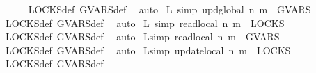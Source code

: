 \begin{isabellebody}
\isadelimproof
\ \ \ \ %
\endisadelimproof
%
\isatagproof
{}\isamarkupfalse%
\ LOCKS{\isacharunderscore}{\kern0pt}def\ GVARS{\isacharunderscore}{\kern0pt}def\ \isamarkupfalse%
\ auto%
\endisatagproof
{\isafoldproof}%
%
\isadelimproof
%
\endisadelimproof
\isanewline
{}\isamarkupfalse%
\ L{}\ {\isacharbrackleft}{\kern0pt}simp{\isacharbrackright}{\kern0pt}{\isacharcolon}{\kern0pt}\ {\isacartoucheopen}upd\isactrlsub g\isactrlsub l\isactrlsub o\isactrlsub b\isactrlsub a\isactrlsub l\ n\ m\ {\isasymin}\ GVARS{\isacartoucheclose}%
\isadelimproof
\ \ \ \ %
\endisadelimproof
%
\isatagproof
{}\isamarkupfalse%
\ LOCKS{\isacharunderscore}{\kern0pt}def\ GVARS{\isacharunderscore}{\kern0pt}def\ \isamarkupfalse%
\ auto%
\endisatagproof
{\isafoldproof}%
%
\isadelimproof
%
\endisadelimproof
\isanewline
\isanewline
{}\isamarkupfalse%
\ L{}\ {\isacharbrackleft}{\kern0pt}simp{\isacharbrackright}{\kern0pt}{\isacharcolon}{\kern0pt}\ {\isacartoucheopen}read\isactrlsub l\isactrlsub o\isactrlsub c\isactrlsub a\isactrlsub l\ n\ m\ {\isasymnotin}\ LOCKS{\isacartoucheclose}%
\isadelimproof
\ \ \ \ %
\endisadelimproof
%
\isatagproof
{}\isamarkupfalse%
\ LOCKS{\isacharunderscore}{\kern0pt}def\ GVARS{\isacharunderscore}{\kern0pt}def\ \isamarkupfalse%
\ auto%
\endisatagproof
{\isafoldproof}%
%
\isadelimproof
%
\endisadelimproof
\isanewline
{}\isamarkupfalse%
\ L{}{}{\isacharbrackleft}{\kern0pt}simp{\isacharbrackright}{\kern0pt}{\isacharcolon}{\kern0pt}\ {\isacartoucheopen}read\isactrlsub l\isactrlsub o\isactrlsub c\isactrlsub a\isactrlsub l\ n\ m\ {\isasymnotin}\ GVARS{\isacartoucheclose}%
\isadelimproof
\ \ \ \ %
\endisadelimproof
%
\isatagproof
{}\isamarkupfalse%
\ LOCKS{\isacharunderscore}{\kern0pt}def\ GVARS{\isacharunderscore}{\kern0pt}def\ \isamarkupfalse%
\ auto%
\endisatagproof
{\isafoldproof}%
%
\isadelimproof
%
\endisadelimproof
\isanewline
{}\isamarkupfalse%
\ L{}{}{\isacharbrackleft}{\kern0pt}simp{\isacharbrackright}{\kern0pt}{\isacharcolon}{\kern0pt}\ {\isacartoucheopen}update\isactrlsub l\isactrlsub o\isactrlsub c\isactrlsub a\isactrlsub l\ n\ m\ {\isasymnotin}\ LOCKS{\isacartoucheclose}%
\isadelimproof
\ \ %
\endisadelimproof
%
\isatagproof
{}\isamarkupfalse%
\ LOCKS{\isacharunderscore}{\kern0pt}def\ GVARS{\isacharunderscore}{\kern0pt}def\ \isamarkupfalse%

\end{isabellebody}
